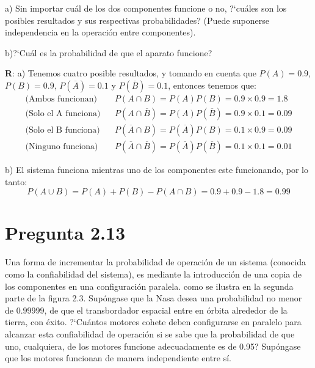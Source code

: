 \documentclass{article}
\newcommand{\prob}[1]{{P} \left( {#1} \right)}
\begin{document}
a) Sin importar cuál de los dos componentes funcione o no, ?`cuáles son los posibles resultados y sus respectivas probabilidades?
(Puede suponerse independencia en la operación entre componentes).

b)?`Cuál es la probabilidad de que el aparato funcione?

\vspace{0.4cm}

\textbf{R}: a) Tenemos cuatro posible resultados, y tomando en cuenta que $\prob{A} = 0.9$, $\prob{B} = 0.9$, $\prob{\overline{A}} = 0.1$
y $\prob{\overline{B}} = 0.1$, entonces tenemos que:
\begin{align*}
\text{(Ambos funcionan)}    \ \ \ \  & \prob{A \cap B} = \prob{A} \prob{B} = 0.9 \times 0.9 = 1.8 \\
\text{(Solo el A funciona)}	\ \ \ \  & \prob{A \cap \overline{B}} = \prob{A} \prob{\overline{B}} = 0.9 \times 0.1 = 0.09 \\
\text{(Solo el B funciona)} \ \ \ \  & \prob{\overline{A} \cap B} = \prob{\overline{A}} \prob{B} = 0.1 \times 0.9 = 0.09 \\
\text{(Ninguno funciona)}   \ \ \ \  & \prob{\overline{A} \cap \overline{B}} = \prob{\overline{A}} \prob{\overline{B}} = 0.1 \times 0.1 = 0.01
\end{align*}

b) El sistema funciona mientras uno de los componentes este funcionando, por lo tanto:
\begin{equation*}
	\prob{A \cup B} = \prob{A} + \prob{B} - \prob{A \cap B} = 0.9 + 0.9 - 1.8 = 0.99
\end{equation*}


\newpage
\section*{Pregunta 2.13}
Una forma de incrementar la probabilidad de operación de un sistema (conocida como la confiabilidad del sistema),
es mediante la introducción de una copia de los componentes en una configuración paralela. como se ilustra en la segunda parte
de la figura 2.3. Supóngase que la Nasa desea una probabilidad no menor de $0.99999$, de que el transbordador espacial entre en órbita
alrededor de la tierra, con éxito. ?`Cuántos motores cohete deben configurarse en paralelo para alcanzar esta confiabilidad de
operación si se sabe que la probabilidad de que uno, cualquiera, de los motores funcione adecuadamente es de 0.95? Supóngase que los motores funcionan de manera independiente entre sí.
\end{document}
